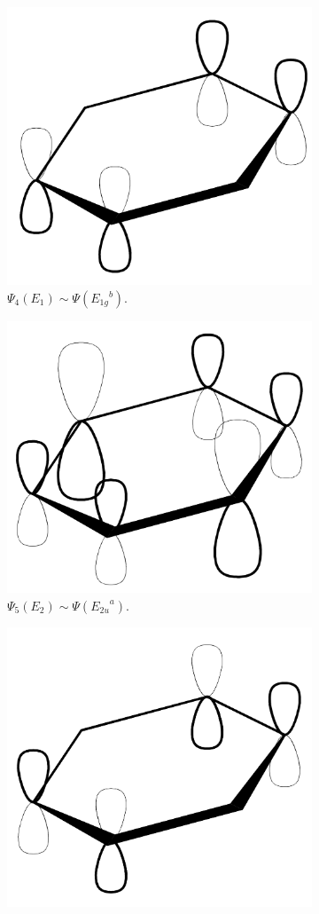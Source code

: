 \documentclass[../notes.tex]{subfiles}
\begin{document}
\begin{itemize}
\begin{itemize}
\begin{figure}[h!]
\begin{subfigure}[b]{0.25\linewidth}
                \centering
                \includegraphics[width=0.7\linewidth]{../ExtFiles/benzeneMOsd.png}
                \caption{$\Psi_4(E_1)\sim\Psi({E_{1g}}^b)$.}
                \label{fig:benzeneMOsd}
            \end{subfigure}
            \begin{subfigure}[b]{0.25\linewidth}
                \centering
                \includegraphics[width=0.7\linewidth]{../ExtFiles/benzeneMOse.png}
                \caption{$\Psi_5(E_2)\sim\Psi({E_{2u}}^a)$.}
                \label{fig:benzeneMOse}
            \end{subfigure}
            \begin{subfigure}[b]{0.25\linewidth}
                \centering
                \includegraphics[width=0.7\linewidth]{../ExtFiles/benzeneMOsf.png}

\end{subfigure}
\end{figure}
\end{itemize}
\end{itemize}
\end{document}
